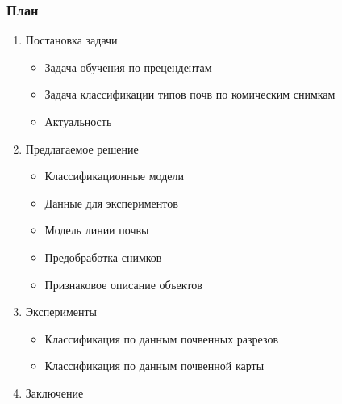 \documentclass{beamer}
\begin{document}
\begin{frame}
\frametitle{План}
\begin{enumerate}
    \item Постановка задачи
        \begin{itemize}
            \item Задача обучения по прецендентам
            \item Задача классификации типов почв по комическим снимкам
            \item Актуальность
        \end{itemize}
    \item Предлагаемое решение
    \begin{itemize}
        \item Классификационные модели
        \item Данные для экспериментов
        \item Модель линии почвы
        \item Предобработка снимков
        \item Признаковое описание объектов
    \end{itemize}
    \item Эксперименты
    \begin{itemize}
        \item Классификация по данным почвенных разрезов
        \item Классификация по данным почвенной карты
    \end{itemize}
    \item {\color{blue} Заключение}
\end{enumerate}
\end{frame}
\end{document}
